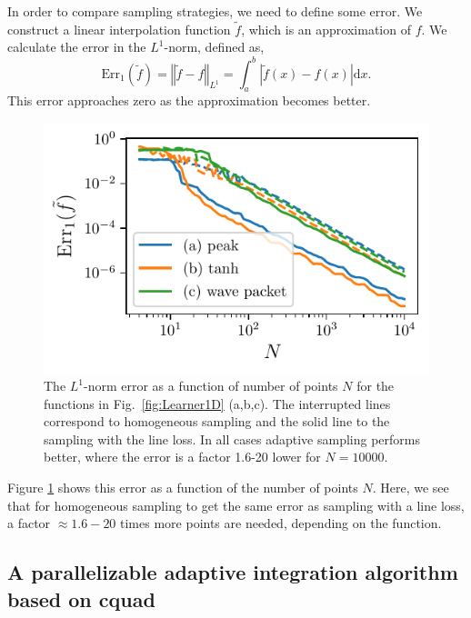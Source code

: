 \documentclass[english, twocolumn, 10pt, aps, superscriptaddress, floatfix, prb, citeautoscript]{revtex4-1}
\begin{document}
In order to compare sampling strategies, we need to define some error.
We construct a linear interpolation function \(\tilde{f}\), which is an approximation of \(f\).
We calculate the error in the \(L^{1}\)-norm, defined as,
\[
\text{Err}_{1}(\tilde{f})=\left\Vert \tilde{f}-f\right\Vert _{L^{1}}=\int_{a}^{b}\left|\tilde{f}(x)-f(x)\right|\text{d}x.
\]
This error approaches zero as the approximation becomes better.

\begin{figure}
\hypertarget{fig:line_loss_error}{%
\centering
\includegraphics{figures/line_loss_error.pdf}
\caption{The \(L^{1}\)-norm error as a function of number of points \(N\) for the functions in Fig.~\ref{fig:Learner1D} (a,b,c).
The interrupted lines correspond to homogeneous sampling and the solid line to the sampling with the line loss.
In all cases adaptive sampling performs better, where the error is a factor 1.6-20 lower for \(N=10000\).}\label{fig:line_loss_error}
}
\end{figure}

Figure \ref{fig:line_loss_error} shows this error as a function of the number of points \(N\).
Here, we see that for homogeneous sampling to get the same error as sampling with a line loss, a factor \(\approx 1.6-20\) times more points are needed, depending on the function.

\hypertarget{a-parallelizable-adaptive-integration-algorithm-based-on-cquad}{%
\subsection{A parallelizable adaptive integration algorithm based on cquad}\label{a-parallelizable-adaptive-integration-algorithm-based-on-cquad}}
\end{document}
